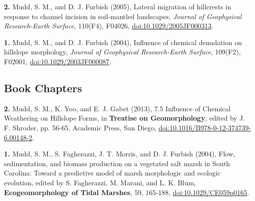 \documentclass[10pt, a4paper]{article}
\newcommand{\years}[1]{\marginnote{\scriptsize #1}}
\begin{document}
\years{2005}\hangindent=0.7cm\textbf{2.} Mudd, S. M., and D. J. Furbish (2005), Lateral migration of hillcrests in response to channel incision in soil-mantled landscapes, \textit{Journal of Geophysical Research-Earth Surface}, 110(F4), F04026, \href{http://dx.doi.org/doi:10.1029/2005JF000313}{doi:10.1029/2005JF000313}.\par

\years{2004}\hangindent=0.7cm\textbf{1.} Mudd, S. M., and D. J. Furbish (2004), Influence of chemical denudation on hillslope morphology, \textit{Journal of Geophysical Research-Earth Surface}, 109(F2), F02001, \href{http://dx.doi.org/doi:10.1029/2003JF000087}{doi:10.1029/2003JF000087}.\par

\subsection*{Book Chapters}
\noindent
\years{2013}\hangindent=0.7cm\textbf{2.} Mudd, S. M., K. Yoo, and E. J. Gabet (2013), 7.5 Influence of Chemical Weathering on Hillslope Forms, in \textbf{Treatise on Geomorphology}, edited by J. F. Shroder, pp. 56-65, Academic Press, San Diego, \href{http://dx.doi.org/doi:10.1016/B978-0-12-374739-6.00148-2}{doi:10.1016/B978-0-12-374739-6.00148-2}.\par
\years{2004}\hangindent=0.7cm\textbf{1.} Mudd, S. M., S. Fagherazzi, J. T. Morris, and D. J. Furbish (2004), Flow, sedimentation, and biomass production on a vegetated salt marsh in South Carolina: Toward a predictive model of marsh morphologic and ecologic evolution, edited by S. Fagherazzi, M. Marani, and L. K. Blum, \textbf{Ecogeomorphology of Tidal Marshes}, 59, 165-188, \href{http://dx.doi.org/doi:10.1029/CE059p0165}{doi:10.1029/CE059p0165}.\par
\end{document}
